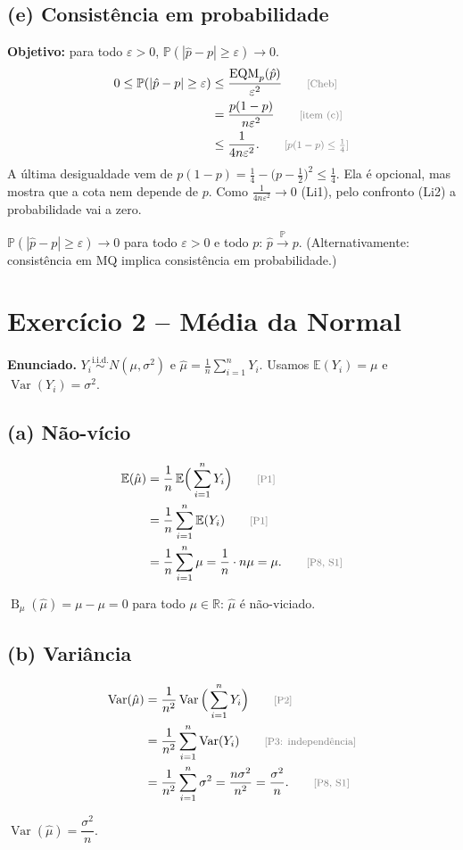 \documentclass[11pt,a4paper]{article}
\newcommand{\E}{\mathbb{E}}
\newcommand{\Var}{\operatorname{Var}}
\newcommand{\EQM}{\operatorname{EQM}}
\newcommand{\B}{\operatorname{B}}
\newcommand{\Prob}{\mathbb{P}}
\newcommand{\R}{\mathbb{R}}
\newcommand{\iid}{\overset{\text{i.i.d.}}{\sim}}
\newcommand{\convP}{\xrightarrow{\;\Prob\;}}
\newcommand{\just}[1]{\tag*{\footnotesize\textcolor{gray}{[#1]}}}
\begin{document}
\subsection*{(e) Consistência em probabilidade}
\textbf{Objetivo:} para todo $\varepsilon>0$, $\Prob(|\hat p-p|\ge\varepsilon)\to0$.
\begin{align*}
0\le\Prob(|\hat p-p|\ge\varepsilon)&\le\frac{\EQM_p(\hat p)}{\varepsilon^2} \just{Cheb}\\
&=\frac{p(1-p)}{n\varepsilon^2} \just{item (c)}\\
&\le\frac{1}{4n\varepsilon^2}. \just{$p(1-p)\le\frac14$}
\end{align*}
A última desigualdade vem de $p(1-p)=\frac14-\big(p-\frac12\big)^2\le\frac14$. Ela é opcional, mas mostra que a cota nem depende de $p$. Como $\frac{1}{4n\varepsilon^2}\to0$ (Li1), pelo confronto (Li2) a probabilidade vai a zero.
\begin{resposta}
$\Prob(|\hat p-p|\ge\varepsilon)\to0$ para todo $\varepsilon>0$ e todo $p$: $\hat p\convP p$. (Alternativamente: consistência em MQ implica consistência em probabilidade.)
\end{resposta}

\section{Exercício 2 -- Média da Normal}

\textbf{Enunciado.} $Y_i\iid N(\mu,\sigma^2)$ e $\hat\mu=\frac1n\sum_{i=1}^nY_i$. Usamos $\E(Y_i)=\mu$ e $\Var(Y_i)=\sigma^2$.

\subsection*{(a) Não-vício}
\begin{align*}
\E(\hat\mu)&=\frac1n\,\E\Big(\sum_{i=1}^nY_i\Big) \just{P1}\\
&=\frac1n\sum_{i=1}^n\E(Y_i) \just{P1}\\
&=\frac1n\sum_{i=1}^n\mu=\frac1n\cdot n\mu=\mu . \just{P8, S1}
\end{align*}
\begin{resposta}
$\B_\mu(\hat\mu)=\mu-\mu=0$ para todo $\mu\in\R$: $\hat\mu$ é não-viciado.
\end{resposta}

\subsection*{(b) Variância}
\begin{align*}
\Var(\hat\mu)&=\frac1{n^2}\Var\Big(\sum_{i=1}^nY_i\Big) \just{P2}\\
&=\frac1{n^2}\sum_{i=1}^n\Var(Y_i) \just{P3: independência}\\
&=\frac1{n^2}\sum_{i=1}^n\sigma^2=\frac{n\sigma^2}{n^2}=\frac{\sigma^2}{n}. \just{P8, S1}
\end{align*}
\begin{resposta}
$\Var(\hat\mu)=\dfrac{\sigma^2}{n}$.
\end{resposta}
\end{document}
